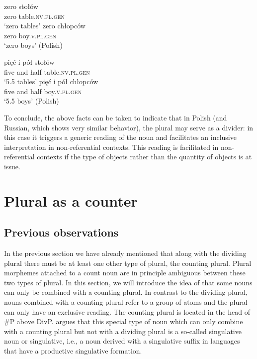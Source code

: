 \documentclass[output=paper,colorlinks,citecolor=brown,
]{langscibook}
\begin{document}
\ea\label{ex:19} 
\ea\gll zero stołów \\
zero table.\textsc{nv.pl.gen} \\
\glt `zero tables' \label{ex:19a}
\ex\gll zero chłopców \\
zero boy.\textsc{v.pl.gen} \\
\glt `zero boys' \label{ex:19b}
\hfill (Polish)\z\z

\ea\label{ex:20} 
\ea\gll pięć i pół stołów \\
five and half table.\textsc{nv.pl.gen} \\
\glt `5.5 tables' \label{ex:20a}
\ex\gll pięć i pół chłopców \\
five and half boy.\textsc{v.pl.gen} \\
\glt `5.5 boys' \label{ex:20b}
\hfill (Polish)\z\z

\noindent To conclude, the above facts can be taken to indicate that in Polish (and Russian, which shows very similar behavior), the plural may serve as a divider: in this case it triggers a generic reading of the noun and facilitates an inclusive interpretation in non-referential contexts. This reading is facilitated in non-referential contexts if the type of objects rather than the quantity of objects is at issue.


\section{Plural as a counter}\label{sec:3}

\subsection{Previous observations}\label{sec:3.1}

In the previous section we have already mentioned that along with the dividing plural there must be at least one other type of plural, the counting plural. Plural morphemes attached to a count noun are in principle ambiguous between these two types of plural. In this section, we will introduce the idea of \citet{Mathieu2012,Mathieu2014} that some nouns can only be combined with a counting plural. In contrast to the dividing plural, nouns combined with a counting plural refer to a group of atoms and the plural can only have an exclusive reading. The counting plural is located in the head of \#P above DivP. \citet{Mathieu2012,Mathieu2014} argues that this special type of noun which can only combine with a counting plural but not with a dividing plural is a so-called singulative noun or singulative, i.e., a noun derived with a singulative suffix in languages that have a productive singulative formation.   
\end{document}
